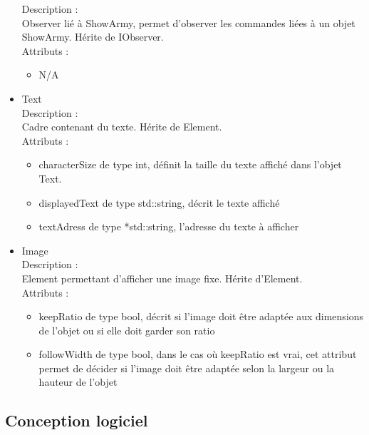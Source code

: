 \documentclass[a4paper,12pt]{article}
\begin{document}
\begin{itemize}
Description :\\
Observer lié à ShowArmy, permet d'observer les commandes liées à un objet ShowArmy. Hérite de IObserver.\\
Attributs :
\begin{itemize}
\item N/A\\
\end{itemize}
\item Text\\
Description :\\
Cadre contenant du texte. Hérite de Element.\\
Attributs :
\begin{itemize}
\item characterSize de type int, définit la taille du texte affiché dans l'objet Text.
\item displayedText de type std::string, décrit le texte affiché
\item textAdress de type *std::string, l'adresse du texte à afficher\\
\end{itemize}
\item Image\\
Description :\\
Element permettant d'afficher une image fixe. Hérite d'Element.\\
Attributs :
\begin{itemize}
\item keepRatio de type bool, décrit si l'image doit être adaptée aux dimensions de l'objet ou si elle doit garder son ratio
\item followWidth de type bool, dans le cas où keepRatio est vrai, cet attribut permet de décider si l'image doit être adaptée selon la largeur ou la hauteur de l'objet\\
\end{itemize}
\end{itemize}

 

\subsection{Conception logiciel}
\end{document}
